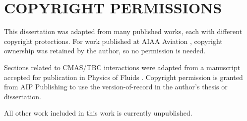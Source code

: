 \documentclass{UCF_ETD}
\begin{document}
\appendix



\chapter{COPYRIGHT PERMISSIONS}
This dissertation was adapted from many published works, each with different copyright protections. For work published at AIAA Aviation \cite{CavainoloAviation24, Cavainolo2023,Cavainolo2022}, copyright ownership was retained by the author, so no permission is needed. 

Sections related to CMAS/TBC interactions were adapted from a manuscript accepted for publication in Physics of Fluids \cite{CavainoloPoF}. Copyright permission is granted from AIP Publishing to use the version-of-record in the author's thesis or dissertation.

All other work included in this work is currently unpublished.










\backmatter

\end{document}
